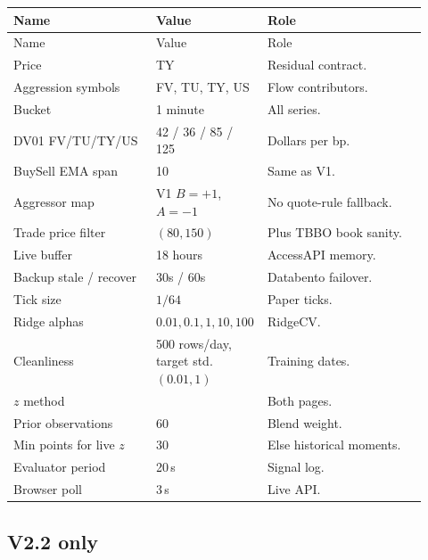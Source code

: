 \documentclass[11pt]{article}
\newcommand{\code}[1]{\texttt{\detokenize{#1}}}
\begin{document}
\begin{longtable}{@{}p{0.34\linewidth}p{0.20\linewidth}p{0.38\linewidth}@{}}
\toprule
Name & Value & Role \\
\midrule
\endfirsthead
\toprule
Name & Value & Role \\
\midrule
\endhead
Price & TY & Residual contract. \\
Aggression symbols & FV, TU, TY, US & Flow contributors. \\
Bucket & 1 minute & All series. \\
DV01 FV/TU/TY/US & 42 / 36 / 85 / 125 & Dollars per bp. \\
BuySell EMA span & 10 & Same as V1. \\
Aggressor map & V1 \(B=+1\), \(A=-1\) & No quote-rule fallback. \\
Trade price filter & \((80,150)\) & Plus TBBO book sanity. \\
Live buffer & 18 hours & AccessAPI memory. \\
Backup stale / recover & 30s / 60s & Databento failover. \\
Tick size & \(1/64\) & Paper ticks. \\
Ridge alphas & \(0.01,0.1,1,10,100\) & RidgeCV. \\
Cleanliness & 500 rows/day, target std.\ \((0.01,1)\) & Training dates. \\
\(z\) method & \code{prior_blend_v1} & Both pages. \\
Prior observations & 60 & Blend weight. \\
Min points for live \(z\) & 30 & Else historical moments. \\
Evaluator period & 20\,s & Signal log. \\
Browser poll & 3\,s & Live API. \\
\bottomrule
\end{longtable}

\subsection{V2.2 only}
\end{document}
